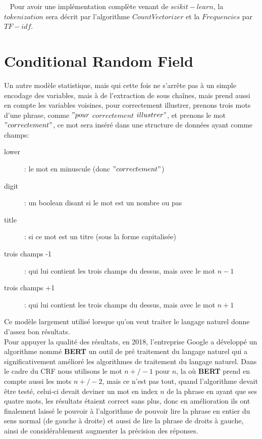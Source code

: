 \ \linebreak
Pour avoir une implémentation complète venant de $scikit-learn$, la $tokenization$ sera décrit par l'algorithme $CountVectorizer$ et la $Frequencies$ par $TF-idf$.\\
\pagebreak

\section{Conditional Random Field}
Un autre modèle statistique, mais qui cette fois ne s'arrête pas à un simple encodage des variables, mais à de l'extraction de sous chaînes, mais prend aussi en compte les variables voisines, pour correctement illustrer, prenons trois mots d'une phrase, comme $"pour$ $correctement$ $illustrer"$, et prenons le mot $"correctement"$, ce mot sera inséré dans une structure de données ayant comme champs:
\begin{description}
\item[lower]: le mot en minuscule (donc $"correctement"$)
\item[digit]: un boolean disant si le mot est un nombre ou pas
\item[title]: si ce mot est un titre (sous la forme capitalisée)
\item[trois champs -1]: qui lui contient les trois champs du dessus, mais avec le mot $n-1$ 
\item[trois champs +1]: qui lui contient les trois champs du dessus, mais avec le mot $n+1$ 
\end{description}

Ce modèle largement utilisé lorsque qu'on veut traiter le langage naturel donne d'assez bon résultats.\\
\linebreak
Pour appuyer la qualité des résultats, en 2018, l'entreprise Google a développé un algorithme nommé \textbf{BERT} un outil de pré traitement du langage naturel qui a significativement amélioré les algorithmes de traitement du langage naturel. Dans le cadre du CRF nous utilisons le mot $n+/-1$ pour $n$, la où \textbf{BERT} prend en compte aussi les mots $n+/-2$, mais ce n'est pas tout, quand l'algorithme devait être testé, celui-ci devait deviner un mot en index $n$ de la phrase en ayant que ses quatre mots, les résultats étaient correct sans plus, donc en amélioration ils ont finalement laissé le pouvoir à l'algorithme de pouvoir lire la phrase en entier du sens normal (de gauche à droite) et aussi de lire la phrase de droits à gauche, ainsi de considérablement augmenter la précision des réponses.


